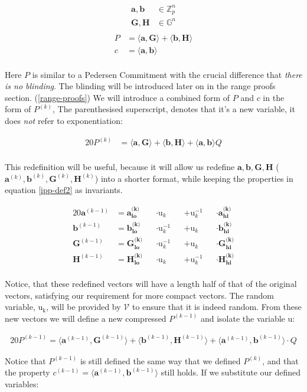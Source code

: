 \documentclass{article}
\newcommand{\eq}[1]{\begin{alignat*}{20}#1\end{alignat*}}
\newcommand{\eqn}[2]{\begin{equation}\label{#1}\begin{split}#2\end{split}\end{equation}}
\renewcommand{\vec}[1]{\boldsymbol{#1}}
\newcommand{\ran}[1]{\mathrm{#1}}
\newcommand{\V}{\mathcal{V}}
\newcommand{\G}{\mathbb{G}}
\newcommand{\Z}{\mathbb{Z}}
\newcommand{\dotp}[2]{\langle #1, #2 \rangle}
\newcommand{\opn}[1]{\operatorname{#1}}
\newcommand{\veclo}[1]{\vec{#1_{\opn{lo}}}}
\newcommand{\vechi}[1]{\vec{#1_{\opn{hi}}}}
\begin{document}
\eqn{ipp-def1}{
	\vec{a}, \vec{b} &\in \Z^n_p \\
	\vec{G}, \vec{H} &\in \G^n \\
}
\eqn{ipp-def2}{
	P &= \dotp{\vec{a}}{\vec{G}} + \dotp{\vec{b}}{\vec{H}} \\
	c &= \dotp{\vec{a}}{\vec{b}} \\
}

Here $P$ is similar to a Pedersen Commitment with the crucial difference
that \textit{there is no blinding}. The blinding will be introduced
later on in the range proofs section. (\ref{range-proofs}) We will
introduce a combined form of $P$ and $c$ in the form of $P^{(k)}$,
The parenthesised superscript, denotes that it's a new variable,
it does \textit{not} refer to exponentiation:

\eq{
	P^{(k)} &= \dotp{\vec{a}}{\vec{G}} +
	           \dotp{\vec{b}}{\vec{H}} +
	           \dotp{\vec{a}}{\vec{b}}Q \\
} 

This redefinition will be useful, because it will allow us redefine
$\vec{a}, \vec{b}, \vec{G}, \vec{H}$ ($\vec{a}^{(k)}, \vec{b}^{(k)},
\vec{G}^{(k)}, \vec{H}^{(k)}$) into a shorter format, while keeping the
properties in equation \ref{ipp-def2} as invariants.

\eq{
	\vec{a}^{(k-1)} &= \veclo{a^{\text{(k)}}} &&\cdot \ran{u}_k      &&+ \ran{u}^{-1}_k &&\cdot \vechi{a^{\text{(k)}}} \\
	\vec{b}^{(k-1)} &= \veclo{b^{\text{(k)}}} &&\cdot \ran{u}^{-1}_k &&+ \ran{u}_k      &&\cdot \vechi{b^{\text{(k)}}} \\
	\vec{G}^{(k-1)} &= \veclo{G^{\text{(k)}}} &&\cdot \ran{u}^{-1}_k &&+ \ran{u}_k      &&\cdot \vechi{G^{\text{(k)}}} \\
	\vec{H}^{(k-1)} &= \veclo{H^{\text{(k)}}} &&\cdot \ran{u}_k      &&+ \ran{u}^{-1}_k &&\cdot \vechi{H^{\text{(k)}}} \\
}

Notice, that these redefined vectors will have a length half of that
of the original vectors, satisfying our requirement for more compact
vectors. The random variable, $\ran{u_k}$, will be provided by $\V$
to ensure that it is indeed random. From these new vectors we will
define a new compressed $P^{(k-1)}$ and isolate the variable $\ran{u}$:

\eq{
	P^{(k-1)} =
	\dotp{\vec{a}^{(k-1)}}{\vec{G}^{(k-1)}} +
	\dotp{\vec{b}^{(k-1)}}{\vec{H}^{(k-1)}} +
	\dotp{\vec{a}^{(k-1)}}{\vec{b}^{(k-1)}} \cdot Q
}

Notice that $P^{(k-1)}$ is still defined the same way
that we defined $P^{(k)}$, and that the property $c^{(k-1)} =
\dotp{\vec{a}^{(k-1)}}{\vec{b}^{(k-1)}}$ still holds. If we substitute
our defined variables:
\end{document}
